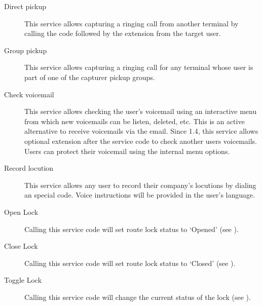 \documentclass[letterpaper,10pt,english]{sphinxmanual}
\begin{document}
\noindent{}
\begin{description}
\item[{Direct pickup}] \leavevmode{}\label{platform/services:term-direct-pickup}
This service allows capturing a ringing call from another terminal by
calling the code followed by the extension from the target user.

\item[{Group pickup}] \leavevmode{}\label{platform/services:term-group-pickup}
This service allows capturing a ringing call for any terminal whose user
is part of one of the capturer pickup groups.

\item[{Check voicemail}] \leavevmode{}\label{platform/services:term-check-voicemail}
This service allows checking the user's voicemail using an interactive
menu from which new voicemails can be listen, deleted, etc. This is an
active alternative to receive voicemails via the email. Since 1.4, this
service allows optional extension after the service code to check
another users voicemails. Users can protect their voicemail using the
internal menu options.

\item[{Record locution}] \leavevmode{}\label{platform/services:term-record-locution}
This service allows any user to record their company's locutions by
dialing an special code. Voice instructions will be provided in the
user's language.

\item[{Open Lock}] \leavevmode{}\label{platform/services:term-open-lock}
Calling this service code will set route lock status to `Opened' (see {\hyperref[company/route_locks:route\string-locks]{}}).

\item[{Close Lock}] \leavevmode{}\label{platform/services:term-close-lock}
Calling this service code will set route lock status to `Closed' (see {\hyperref[company/route_locks:route\string-locks]{}}).

\item[{Toggle Lock}] \leavevmode{}\label{platform/services:term-toggle-lock}
Calling this service code will change the current status of the lock (see {\hyperref[company/route_locks:route\string-locks]{}}).

\end{description}
\end{document}
